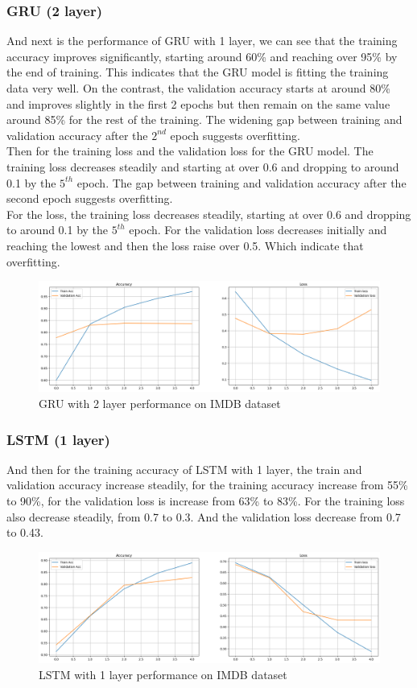 \documentclass[12pt,a4paper]{article}
\begin{document}
\subsubsection{GRU (2 layer)}
And next is the performance of GRU with 1 layer, we can see that the training accuracy improves significantly, starting around 60\% and reaching over 95\% by the end of training. This indicates that the GRU model is fitting the training data very well. On the contrast, the validation accuracy starts at around 80\% and improves slightly in the first 2 epochs but then remain on the same value around 85\% for the rest of the training. The widening gap between training and validation accuracy after the $2^{nd}$ epoch suggests overfitting. 
\\[1ex]
Then for the training loss and the validation loss for the GRU model. The training loss decreases steadily and starting at over 0.6 and dropping to around 0.1 by the $5^{th}$ epoch. The gap between training and validation accuracy after the second epoch suggests overfitting.
\\[1ex]
For the loss, the training loss decreases steadily, starting at over 0.6 and dropping to around 0.1 by the $5^{th}$ epoch. For the validation loss decreases initially and reaching the lowest and then the loss raise over 0.5. Which indicate that overfitting.
\begin{figure}[h!]
    \centering
    \includegraphics[width=1\textwidth]{../Pic/gru2.png} 
    \caption{GRU with 2 layer performance on IMDB dataset}
\end{figure}

\subsubsection{LSTM (1 layer)}
And then for the training accuracy of LSTM with 1 layer, the train and validation accuracy increase steadily, for the training accuracy increase from 55\% to 90\%, for the validation loss is increase from 63\% to 83\%. For the training loss also decrease steadily, from 0.7 to 0.3. And the validation loss decrease from 0.7 to 0.43.
\begin{figure}[h!]
    \centering
    \includegraphics[width=1\textwidth]{../Pic/lstm1performance.png} 
    \caption{LSTM with 1 layer performance on IMDB dataset}
\end{figure}
\end{document}
